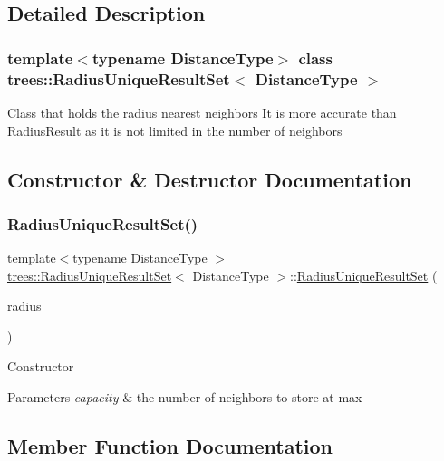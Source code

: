 \subsection{Detailed Description}
\subsubsection*{template$<$typename Distance\+Type$>$\newline
class trees\+::\+Radius\+Unique\+Result\+Set$<$ Distance\+Type $>$}

Class that holds the radius nearest neighbors It is more accurate than Radius\+Result as it is not limited in the number of neighbors 

\subsection{Constructor \& Destructor Documentation}
\mbox{\label{classtrees_1_1_radius_unique_result_set_a257fdf0c924ab9077613c2dc1a3b18ea}} 
\subsubsection{\texorpdfstring{Radius\+Unique\+Result\+Set()}{RadiusUniqueResultSet()}}
{\footnotesize\ttfamily template$<$typename Distance\+Type $>$ \\
\hyperlink{classtrees_1_1_radius_unique_result_set}{trees\+::\+Radius\+Unique\+Result\+Set}$<$ Distance\+Type $>$\+::\hyperlink{classtrees_1_1_radius_unique_result_set}{Radius\+Unique\+Result\+Set} (\begin{DoxyParamCaption}\item[{Distance\+Type}]{radius }\end{DoxyParamCaption})\hspace{0.3cm}{\ttfamily [inline]}}

Constructor 
\begin{DoxyParams}{Parameters}
{\em capacity} & the number of neighbors to store at max \\
\hline
\end{DoxyParams}


\subsection{Member Function Documentation}
\mbox{\label{classtrees_1_1_radius_unique_result_set_ad354a9cee46aa287bb6f9d6bfde50e94}} 
